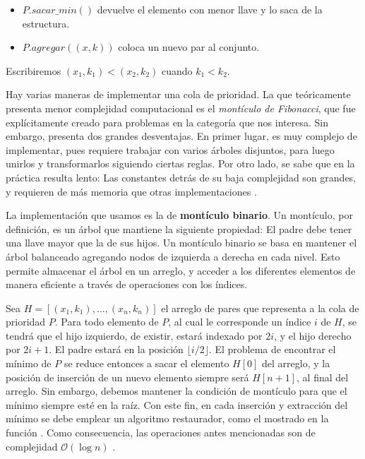 \documentclass[journal]{IEEEtran}
\begin{document}
\begin{itemize}
	\item \(P.sacar\_min()\) devuelve el elemento con menor llave y lo saca de la estructura.
	\item \(P.agregar((x, k))\) coloca un nuevo par al conjunto.
\end{itemize}

Escribiremos \((x_1, k_1) < (x_2, k_2)\) cuando \(k_1 < k_2\).

Hay varias maneras de implementar una cola de prioridad. La que teóricamente presenta menor complejidad computacional es el \textit{montículo de Fibonacci}, que fue explícitamente creado para problemas en la categoría que nos interesa. Sin embargo, presenta dos grandes desventajas. En primer lugar, es muy complejo de implementar, pues requiere trabajar con varios árboles disjuntos, para luego unirlos y transformarlos siguiendo ciertas reglas. Por otro lado, se sabe que en la práctica resulta lento: Las constantes detrás de su baja complejidad son grandes, y requieren de más memoria que otras implementaciones \cite{heap}.

La implementación que usamos es la de \textbf{montículo binario}. Un montículo, por definición, es un árbol que mantiene la siguiente propiedad: El padre debe tener una llave mayor que la de sus hijos. Un montículo binario se basa en mantener el árbol balanceado agregando nodos de izquierda a derecha en cada nivel. Esto permite almacenar el árbol en un arreglo, y acceder a los diferentes elementos de manera eficiente a través de operaciones con los índices.

Sea \(H = [(x_1, k_1),\dots,(x_n, k_n)]\) el arreglo de pares que representa a la cola de prioridad \(P\). Para todo elemento de \(P\), al cual le corresponde un índice \(i\) de \(H\), se tendrá que el hijo izquierdo, de existir, estará indexado por \(2i\), y el hijo derecho por \(2i + 1\). El padre estará en la posición \( \lfloor i/2 \rfloor \). El problema de encontrar el mínimo de \(P\) se reduce entonces a sacar el elemento \(H[0]\) del arreglo, y la posición de inserción de un nuevo elemento siempre será \(H[n+1]\), al final del arreglo. Sin embargo, debemos mantener la condición de montículo para que el mínimo siempre esté en la raíz. Con este fin, en cada inserción y extracción del mínimo se debe emplear un algoritmo restaurador, como el mostrado en la función . Como consecuencia, las operaciones antes mencionadas son de complejidad \( \mathcal{O}(\log n) \) \cite{clrs}.
\end{document}
